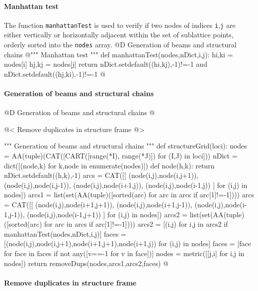 \documentclass[11pt,oneside]{article}    %
\begin{document}
\paragraph{Manhattan test}
The function \texttt{manhattanTest} is used to verify if two nodes of indices \texttt{i},\texttt{j} are either vertically or horizontally adjacent within the set of sublattice points, orderly sorted into the \texttt{nodes} array.
@D Generation of beams and structural chains 
@{""" Manhattan test """
def manhattanTest(nodes,nDict,i,j):
    hi,ki = nodes[i]
    hj,kj = nodes[j]
    return nDict.setdefault((hi,kj),-1)!=-1 and nDict.setdefault((hj,ki),-1)!=-1
@}

\paragraph{Generation of beams and structural chains}
@D Generation of beams and structural chains @{
@< Remove duplicates in structure frame @>

""" Generation of beams and structural chains """
def structureGrid(loci):
    nodes = AA(tuple)(CAT([CART([range(*I), range(*J)]) for (I,J) in loci]))
    nDict = dict([(node,k) for k,node in enumerate(nodes)])
    def node(h,k): return nDict.setdefault((h,k),-1)
    arcs = CAT([[ (node(i,j),node(i,j+1)), (node(i,j),node(i,j-1)),
        (node(i,j),node(i+1,j)), (node(i,j),node(i-1,j)) ] for (i,j) in nodes])
    arcs1 = list(set(AA(tuple)([sorted(arc) for arc in arcs if arc[1]!=-1])))
    arcs = CAT([[ (node(i,j),node(i+1,j+1)), (node(i,j),node(i+1,j-1)),
        (node(i,j),node(i-1,j-1)), (node(i,j),node(i-1,j+1)) ] for (i,j) in nodes])
    arcs2 = list(set(AA(tuple)([sorted(arc) for arc in arcs if arc[1]!=-1])))
    arcs2 = [(i,j) for i,j in arcs2 if manhattanTest(nodes,nDict,i,j)]
    faces = [(node(i,j),node(i,j+1),node(i+1,j+1),node(i+1,j)) for (i,j) in nodes]
    faces = [face for face in faces if not any([v==-1 for v in face])]
    nodes = metric([[j,i] for i,j in nodes])
    return removeDups(nodes,arcs1,arcs2,faces)
@}


\paragraph{Remove duplicates in structure frame}
\end{document}
